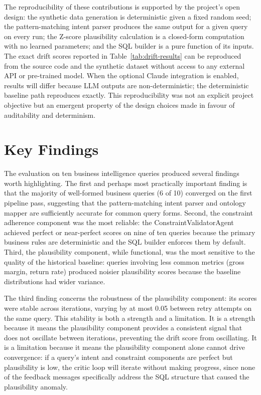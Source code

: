 \documentclass[12pt,a4paper]{report}
\begin{document}
The reproducibility of these contributions is supported by the project's open design: the synthetic data generation is deterministic given a fixed random seed; the pattern-matching intent parser produces the same output for a given query on every run; the Z-score plausibility calculation is a closed-form computation with no learned parameters; and the SQL builder is a pure function of its inputs. The exact drift scores reported in Table~\ref{tab:drift-results} can be reproduced from the source code and the synthetic dataset without access to any external API or pre-trained model. When the optional Claude integration is enabled, results will differ because \ac{LLM} outputs are non-deterministic; the deterministic baseline path reproduces exactly. This reproducibility was not an explicit project objective but an emergent property of the design choices made in favour of auditability and determinism.

\section{Key Findings}
\label{sec:findings}

The evaluation on ten business intelligence queries produced several findings worth highlighting. The first and perhaps most practically important finding is that the majority of well-formed business queries (6 of 10) converged on the first pipeline pass, suggesting that the pattern-matching intent parser and ontology mapper are sufficiently accurate for common query forms. Second, the constraint adherence component was the most reliable: the ConstraintValidatorAgent achieved perfect or near-perfect scores on nine of ten queries because the primary business rules are deterministic and the \ac{SQL} builder enforces them by default. Third, the plausibility component, while functional, was the most sensitive to the quality of the historical baseline: queries involving less common metrics (gross margin, return rate) produced noisier plausibility scores because the baseline distributions had wider variance.

The third finding concerns the robustness of the plausibility component: its scores were stable across iterations, varying by at most 0.05 between retry attempts on the same query. This stability is both a strength and a limitation. It is a strength because it means the plausibility component provides a consistent signal that does not oscillate between iterations, preventing the drift score from oscillating. It is a limitation because it means the plausibility component alone cannot drive convergence: if a query's intent and constraint components are perfect but plausibility is low, the critic loop will iterate without making progress, since none of the feedback messages specifically address the SQL structure that caused the plausibility anomaly.
\end{document}
